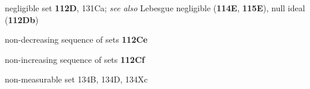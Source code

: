 










negligible set {\bf 112D}, 131Ca; 
  {\it see also} 
Lebesgue negligible ({\bf 114E}, {\bf 115E}), null ideal ({\bf 112Db})




































non-decreasing sequence of sets {\bf 112Ce}

non-increasing sequence of sets {\bf 112Cf}

non-measurable set 134B, 134D, 134Xc













































